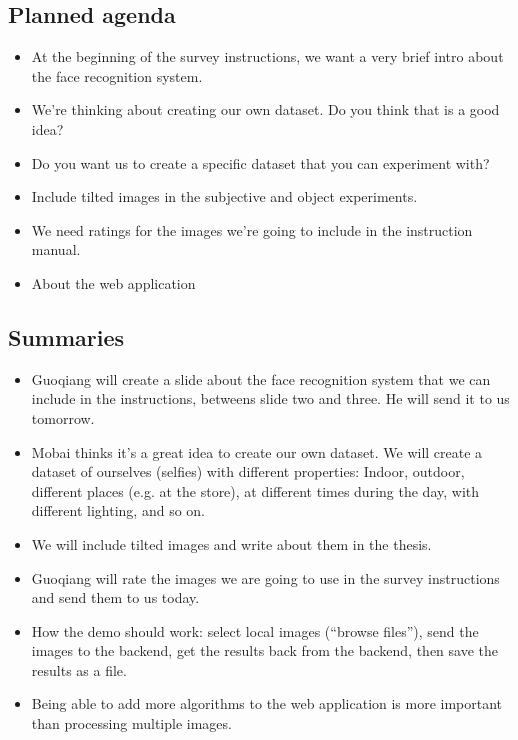 \subsection*{Planned agenda}
\begin{itemize}
    \item At the beginning of the survey instructions, we want a very brief intro about the face recognition system.
    \item We’re thinking about creating our own dataset. Do you think that is a good idea?
    \item Do you want us to create a specific dataset that you can experiment with?
    \item Include tilted images in the subjective and object experiments.
    \item We need ratings for the images we’re going to include in the instruction manual.
    \item About the web application
\end{itemize}

\subsection*{Summaries}
\begin{itemize}
    \item Guoqiang will create a slide about the face recognition system that we can include in the instructions, betweens slide two and three. He will send it to us tomorrow.
    \item Mobai thinks it's a great idea to create our own dataset. We will create a dataset of ourselves (selfies) with different properties: Indoor, outdoor, different places (e.g. at the store), at different times during the day, with different lighting, and so on.
    \item We will include tilted images and write about them in the thesis.
    \item Guoqiang will rate the images we are going to use in the survey instructions and send them to us today.
    \item How the demo should work: select local images (“browse files”), send the images to the backend, get the results back from the backend, then save the results as a file.
    \item Being able to add more algorithms to the web application is more important than processing multiple images.
\end{itemize}

\newpage

